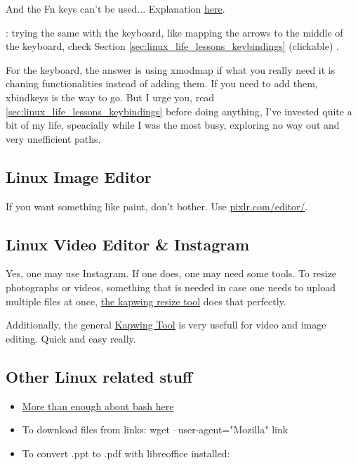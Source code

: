     And the Fn keys can't be used... Explanation \href{https://www.reddit.com/r/i3wm/comments/5jm408/xev_doesnt_see_my_fn_key/}{\ul{here}}.

    : trying the same with the keyboard, like mapping the arrows to the middle of the keyboard, check Section \ref{sec:linux_life_lessons_keybindings} (clickable) .
    
    
\vspace{.5cm}
\par For the keyboard, the answer is using xmodmap if what you really need it is chaning functionalities instead of adding them. If you need to add them, xbindkeys is the way to go. 
But I urge you, read \ref{sec:linux_life_lessons_keybindings} before doing anything, I've invested quite a bit of my life, speacially while I was the most busy, exploring no way out and very unefficient paths.







\subsection{Linux Image Editor}
\par If you want something like paint, don't bother. Use \href{https://pixlr.com/editor/}{\ul{pixlr.com/editor/}}.


\subsection{Linux Video Editor \& Instagram}
Yes, one may use Instagram. If one does, one may need some tools.
To resize photographs or videos, something that is needed in case one needs to upload multiple files at once, \href{https://www.kapwing.com/resize-video}{\ul{the kapwing resize tool}} does that perfectly.


Additionally, the general \href{https://www.kapwing.com/workspace}{\ul{Kapwing Tool}} is very usefull for video and image editing. Quick and easy really.




\subsection{Other Linux related stuff}
\begin{itemize}
    \item \href{http://tldp.org/HOWTO/Bash-Prog-Intro-HOWTO.html}{More than enough about bash here} 
    \item To download files from links: wget --user-agent="Mozilla" link
    \item To convert .ppt to .pdf with libreoffice installed:
\end{itemize}

